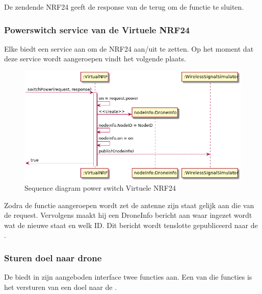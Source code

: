 \documentclass[a4paper, 11pt, oneside]{report}
\begin{document}
De zendende NRF24 geeft de response van de  terug om de functie te sluiten.

\subsubsection{Powerswitch service van de Virtuele NRF24}
\label{DetailedDesign:ros:sequence:powerswitch}

Elke  biedt een service aan om de NRF24 aan/uit te zetten.
Op het moment dat deze service wordt aangeroepen vindt het volgende plaats. 

\begin{figure}[H]
	\begin{center}\includegraphics[width=.8\linewidth]{UML/out/ros/sequence/powerSwitch/powerSwitch.png}\end{center}
	\caption{Sequence diagram power switch Virtuele NRF24}
	\label{fig:ros:sequence:sequence:powerswitch}
\end{figure}

Zodra de functie aangeroepen wordt zet de antenne zijn staat gelijk aan die van de request.
Vervolgens maakt hij een DroneInfo bericht aan waar ingezet wordt wat de nieuwe staat en welk ID.
Dit bericht wordt tenslotte gepubliceerd naar de .



\subsubsection{Sturen doel naar drone}
\label{DetailedDesign:ros:sequence:sturendoelnaarengine}

De  biedt in zijn aangeboden interface twee functies aan.
Een van die functies is het versturen van een doel naar de . 
\end{document}
